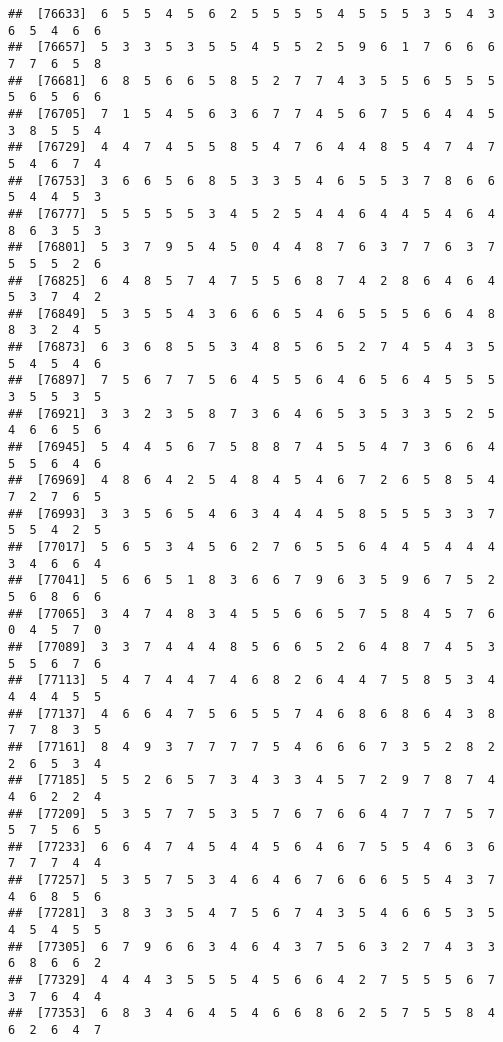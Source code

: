 \documentclass[
]{book}
\begin{document}
\begin{verbatim}
##  [76633]  6  5  5  4  5  6  2  5  5  5  5  4  5  5  5  3  5  4  3  6  5  4  6  6
##  [76657]  5  3  3  5  3  5  5  4  5  5  2  5  9  6  1  7  6  6  6  7  7  6  5  8
##  [76681]  6  8  5  6  6  5  8  5  2  7  7  4  3  5  5  6  5  5  5  5  6  5  6  6
##  [76705]  7  1  5  4  5  6  3  6  7  7  4  5  6  7  5  6  4  4  5  3  8  5  5  4
##  [76729]  4  4  7  4  5  5  8  5  4  7  6  4  4  8  5  4  7  4  7  5  4  6  7  4
##  [76753]  3  6  6  5  6  8  5  3  3  5  4  6  5  5  3  7  8  6  6  5  4  4  5  3
##  [76777]  5  5  5  5  5  3  4  5  2  5  4  4  6  4  4  5  4  6  4  8  6  3  5  3
##  [76801]  5  3  7  9  5  4  5  0  4  4  8  7  6  3  7  7  6  3  7  5  5  5  2  6
##  [76825]  6  4  8  5  7  4  7  5  5  6  8  7  4  2  8  6  4  6  4  5  3  7  4  2
##  [76849]  5  3  5  5  4  3  6  6  6  5  4  6  5  5  5  6  6  4  8  8  3  2  4  5
##  [76873]  6  3  6  8  5  5  3  4  8  5  6  5  2  7  4  5  4  3  5  5  4  5  4  6
##  [76897]  7  5  6  7  7  5  6  4  5  5  6  4  6  5  6  4  5  5  5  3  5  5  3  5
##  [76921]  3  3  2  3  5  8  7  3  6  4  6  5  3  5  3  3  5  2  5  4  6  6  5  6
##  [76945]  5  4  4  5  6  7  5  8  8  7  4  5  5  4  7  3  6  6  4  5  5  6  4  6
##  [76969]  4  8  6  4  2  5  4  8  4  5  4  6  7  2  6  5  8  5  4  7  2  7  6  5
##  [76993]  3  3  5  6  5  4  6  3  4  4  4  5  8  5  5  5  3  3  7  5  5  4  2  5
##  [77017]  5  6  5  3  4  5  6  2  7  6  5  5  6  4  4  5  4  4  4  3  4  6  6  4
##  [77041]  5  6  6  5  1  8  3  6  6  7  9  6  3  5  9  6  7  5  2  5  6  8  6  6
##  [77065]  3  4  7  4  8  3  4  5  5  6  6  5  7  5  8  4  5  7  6  0  4  5  7  0
##  [77089]  3  3  7  4  4  4  8  5  6  6  5  2  6  4  8  7  4  5  3  5  5  6  7  6
##  [77113]  5  4  7  4  4  7  4  6  8  2  6  4  4  7  5  8  5  3  4  4  4  4  5  5
##  [77137]  4  6  6  4  7  5  6  5  5  7  4  6  8  6  8  6  4  3  8  7  7  8  3  5
##  [77161]  8  4  9  3  7  7  7  7  5  4  6  6  6  7  3  5  2  8  2  2  6  5  3  4
##  [77185]  5  5  2  6  5  7  3  4  3  3  4  5  7  2  9  7  8  7  4  4  6  2  2  4
##  [77209]  5  3  5  7  7  5  3  5  7  6  7  6  6  4  7  7  7  5  7  5  7  5  6  5
##  [77233]  6  6  4  7  4  5  4  4  5  6  4  6  7  5  5  4  6  3  6  7  7  7  4  4
##  [77257]  5  3  5  7  5  3  4  6  4  6  7  6  6  6  5  5  4  3  7  4  6  8  5  6
##  [77281]  3  8  3  3  5  4  7  5  6  7  4  3  5  4  6  6  5  3  5  4  5  4  5  5
##  [77305]  6  7  9  6  6  3  4  6  4  3  7  5  6  3  2  7  4  3  3  6  8  6  6  2
##  [77329]  4  4  4  3  5  5  5  4  5  6  6  4  2  7  5  5  5  6  7  3  7  6  4  4
##  [77353]  6  8  3  4  6  4  5  4  6  6  8  6  2  5  7  5  5  8  4  6  2  6  4  7

\end{verbatim}
\end{document}

